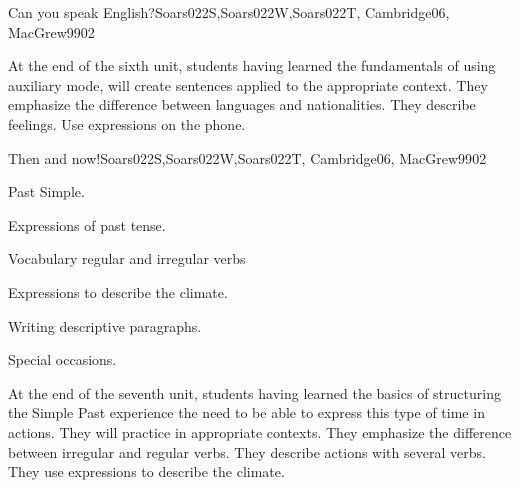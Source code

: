 \begin{syllabus}
\begin{unit}{}{Can you speak English?}{Soars022S,Soars022W,Soars022T, Cambridge06, MacGrew99}{0}{2}
   \begin{learningoutcomes}
      \item At the end of the sixth unit, students having learned the fundamentals of using auxiliary mode, will create sentences applied to the appropriate context. They emphasize the difference between languages and nationalities. They describe feelings. Use expressions on the phone.
   \end{learningoutcomes}

\end{unit}

\begin{unit}{}{Then and now!}{Soars022S,Soars022W,Soars022T, Cambridge06, MacGrew99}{0}{2}
   \begin{topics}
      \item Past Simple.
      \item Expressions of past tense.
      \item Vocabulary regular and irregular verbs
      \item Expressions to describe the climate. 
      \item Writing descriptive paragraphs.
      \item Special occasions.
   \end{topics}

   \begin{learningoutcomes}
      \item At the end of the seventh unit, students having learned the basics of structuring the Simple Past experience the need to be able to express this type of time in actions. They will practice in appropriate contexts. They emphasize the difference between irregular and regular verbs. They describe actions with several verbs. They use expressions to describe the climate.
   \end{learningoutcomes}
\end{unit}



\begin{coursebibliography}
\end{coursebibliography}
\end{syllabus}
%
